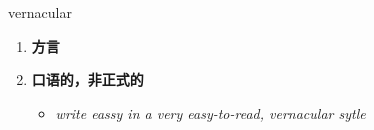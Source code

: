 
\begin{frame}
{\huge vernacular}
\begin{center}
\begin{enumerate}\Large
  \item \textbf{方言}
  \item \textbf{口语的，非正式的}
  \begin{itemize}
    \item \em{\Large{write eassy in a very easy-to-read, vernacular sytle}}
  \end{itemize}
\end{enumerate}
\end{center}
\end{frame}
